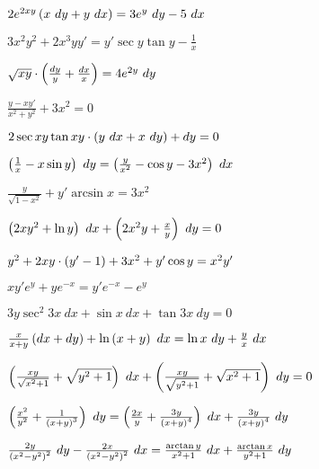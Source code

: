 \begin{multicols}{2}
\begin{enumtasks}
			\item \( 2e^{2xy} \left( x ~ dy + y ~ dx \right) = 3e^{y} ~ dy - 5 ~ dx \) 							%
			\item \( 3x^2 y^2 + 2x^3 y y' = y' \sec{y} \tan{y} - \frac{1}{x} \) 							%
			\item \( \sqrt{xy} \cdot \left( \frac{dy}{y} + \frac{dx}{x} \right) = 4e^{2y} ~ dy \) 					%
			\item \(  \frac{y - xy'}{x^2 + y^2} + 3x^2 = 0  \) 												%
			\item \( 2 \sec{xy} \tan{xy} \cdot \left( y ~ dx + x ~ dy \right) + dy = 0 \) 							%
			\item \( \left( \frac{1}{x} - x \sin{y} \right) ~ dy = \left( \frac{y}{x^2} - \cos{y} - 3x^2 \right) ~ dx \) 	%
			\item \( \frac{y}{\sqrt{1 - x^2}} + y' \arcsin{x} = 3x^2 \) 									%
			\item \( \left( 2xy^2 + \ln{y} \right) ~ dx + \left( 2x^2 y + \frac{x}{y} \right) ~ dy = 0 \) 				%
			\item \( y^2 + 2xy \cdot \left( y' - 1 \right) + 3x^2 + y' \cos{y} = x^2 y' \) 						%
			\item \( xy' e^y + ye^{-x} = y' e^{-x} - e^{y} \) 												%
			\item \( 3y\sec^2{3x} ~ dx + \sin{x} ~ dx + \tan{3x} ~ dy = 0 \) 								%

		\end{enumtasks}
	\end{multicols}

	\begin{enumtasks}
	
		\item \( \frac{x}{x + y} \left( dx + dy \right) + \ln\left( x + y \right) ~ dx = \ln{x} ~ dy + \frac{y}{x} ~ dx \) 																%
		\item \( \left( \frac{xy}{\sqrt{x^2 + 1}} + \sqrt{y^2 + 1} \right) ~ dx + \left( \frac{xy}{\sqrt{y^2 + 1}} + \sqrt{x^2 + 1} \right) ~ dy = 0 \) 									%
		\item \( \left( \frac{x^2}{y^2} + \frac{1}{\left( x + y \right)^3} \right) ~ dy = \left( \frac{2x}{y} + \frac{3y}{\left( x + y \right)^4} \right) ~ dx + \frac{3y}{\left( x + y \right)^4} ~ dy \) 	%
		\item \( \frac{2y}{\left( x^2 - y^2 \right)^2} ~ dy - \frac{2x}{\left( x^2 - y^2 \right)^2} ~ dx = \frac{\arctan{y}}{x^2 + 1} ~ dx + \frac{\arctan{x}}{y^2 + 1} ~ dy \) 			%
	
	\end{enumtasks}

